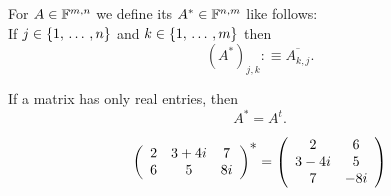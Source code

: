 \begin{mydef}
  For $A \in \mathbb{F}^{m,n}$ we define its  $A^* \in \mathbb{F}^{n,m}$ like follows:\\
  If $j \in \{1, {\, \ldots \,\,}, n\}$ and $k \in \{1, {\, \ldots \,\,}, m\}$ then
  \[
    (A^*)_{j,k} :\equiv \overline{A_{k,j}}.
  \]

  If a matrix has only real entries, then
  \[
    A^* = A^t.
  \]
\end{mydef}

\begin{example}
  \[
    \left(
      \begin{array}{ccc}
      2   & 3+4i  & 7   \\
      6   & 5     & 8i  \\
      \end{array}
    \right)^{\mathlarger{*}}
    =
    \left(
      \begin{array}{cc}
        2     & 6   \\
        3-4i  & 5   \\
        7     & -8i
      \end{array}
    \right)
  \]
\end{example}

